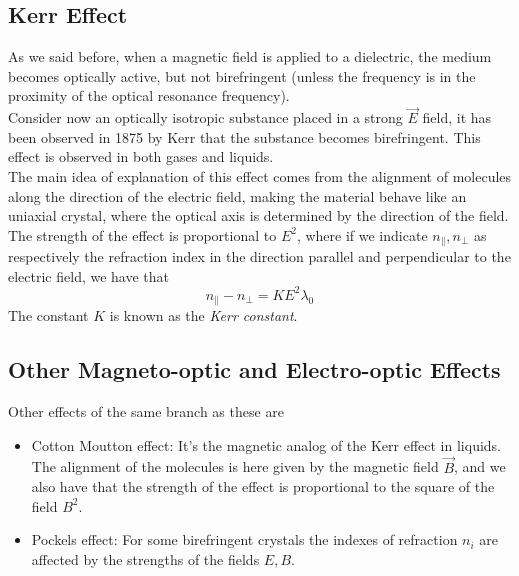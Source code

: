 \documentclass[../electromagnetism.tex]{subfiles}
\begin{document}
\subsection{Kerr Effect}
As we said before, when a magnetic field is applied to a dielectric, the medium becomes optically active, but not birefringent (unless the frequency is in the proximity of the optical resonance frequency).\\
Consider now an optically isotropic substance placed in a strong $\vec{E}$ field, it has been observed in 1875 by Kerr that the substance becomes birefringent. This effect is observed in both gases and liquids.\\
The main idea of explanation of this effect comes from the alignment of molecules along the direction of the electric field, making the material behave like an uniaxial crystal, where the optical axis is determined by the direction of the field.\\
The strength of the effect is proportional to $E^2$, where if we indicate $n_{\parallel}, n_{\perp}$ as respectively the refraction index in the direction parallel and perpendicular to the electric field, we have that
\begin{equation}
	n_{\parallel}-n_{\perp}=KE^2\lambda_0
	\label{eq:kerreffect.eop}
\end{equation}
The constant $K$ is known as the \textit{Kerr constant}.
\subsection{Other Magneto-optic and Electro-optic Effects}
Other effects of the same branch as these are
\begin{itemize}
\item Cotton Moutton effect: It's the magnetic analog of the Kerr effect in liquids. The alignment of the molecules is here given by the magnetic field $\vec{B}$, and we also have that the strength of the effect is proportional to the square of the field $B^2$.
\item Pockels effect: For some birefringent crystals the indexes of refraction $n_i$ are affected by the strengths of the fields $E, B$.
\end{itemize}
\end{document}

